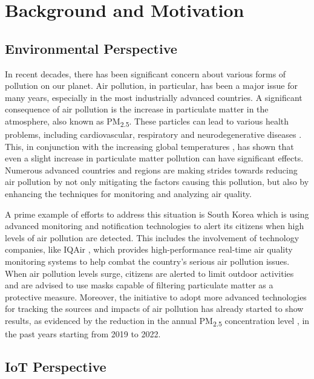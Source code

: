 \chapter{Background and Motivation}
\label{chap2}

\section{Environmental Perspective}

In recent decades, there has been significant concern about various forms of pollution on our planet. Air pollution, in particular, has been a major issue for many years, especially in the most industrially advanced countries. A significant consequence of air pollution is the increase in particulate matter in the atmosphere, also known as PM\textsubscript{2.5}. These particles can lead to various health problems, including cardiovascular, respiratory and neurodegenerative diseases \cite{RecentInsightsParticulateMatter}. This, in conjunction with the increasing global temperatures \cite{effectofheatandairpollution}, has shown that even a slight increase in particulate matter pollution can have significant effects. Numerous advanced countries and regions are making strides towards reducing air pollution by not only mitigating 
 \cite{EuropeEnvironment} the factors causing this pollution, but also by enhancing the techniques for monitoring and analyzing air quality.

A prime example of efforts to address this situation is South Korea \cite{IQAir} which is using advanced monitoring and notification technologies to alert its citizens when high levels of air pollution are detected. This includes the involvement of technology companies, like IQAir \cite{IQAir}, which provides high-performance real-time air quality monitoring systems to help combat the country's serious air pollution issues. When air pollution levels surge, citizens are alerted to limit outdoor activities and are advised to use masks capable of filtering particulate matter as a protective measure. Moreover, the initiative to adopt more advanced technologies for tracking the sources and impacts of air pollution has already started to show results, as evidenced by the reduction in the annual PM\textsubscript{2.5} concentration level \cite{AirPollutionControl}, in the past years starting from 2019 to 2022. 

\section{IoT Perspective}

